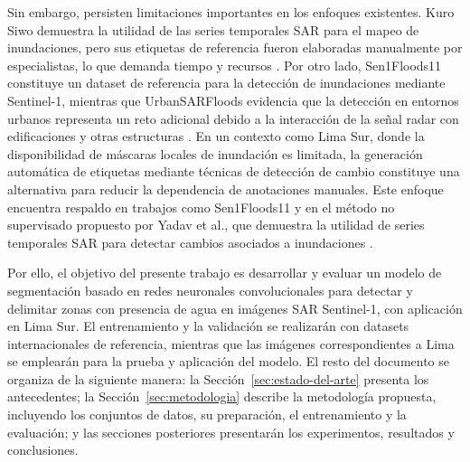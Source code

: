\documentclass[conference]{IEEEtran}
\begin{document}
Sin embargo, persisten limitaciones importantes en los enfoques existentes. Kuro Siwo demuestra la utilidad de las series temporales SAR para el mapeo de inundaciones, pero sus etiquetas de referencia fueron elaboradas manualmente por especialistas, lo que demanda tiempo y recursos \cite{bountos2024kurosiwo}. Por otro lado, Sen1Floods11 constituye un dataset de referencia para la detección de inundaciones mediante Sentinel-1, mientras que UrbanSARFloods evidencia que la detección en entornos urbanos representa un reto adicional debido a la interacción de la señal radar con edificaciones y otras estructuras \cite{bonafilia2020sen1floods11,zhao2024urbansarfloods}. En un contexto como Lima Sur, donde la disponibilidad de máscaras locales de inundación es limitada, la generación automática de etiquetas mediante técnicas de detección de cambio constituye una alternativa para reducir la dependencia de anotaciones manuales. Este enfoque encuentra respaldo en trabajos como Sen1Floods11 y en el método no supervisado propuesto por Yadav et al., que demuestra la utilidad de series temporales SAR para detectar cambios asociados a inundaciones \cite{bonafilia2020sen1floods11,yadav2024unsupervised}.

Por ello, el objetivo del presente trabajo es desarrollar y evaluar un modelo de segmentación basado en redes neuronales convolucionales para detectar y delimitar zonas con presencia de agua en imágenes SAR Sentinel-1, con aplicación en Lima Sur. El entrenamiento y la validación se realizarán con datasets internacionales de referencia, mientras que las imágenes correspondientes a Lima se emplearán para la prueba y aplicación del modelo. El resto del documento se organiza de la siguiente manera:
la Sección~\ref{sec:estado-del-arte} presenta los antecedentes;
la Sección~\ref{sec:metodologia} describe la metodología
propuesta, incluyendo los conjuntos de datos, su preparación,
el entrenamiento y la evaluación; y las secciones posteriores
presentarán los experimentos, resultados y conclusiones.


\end{document}
